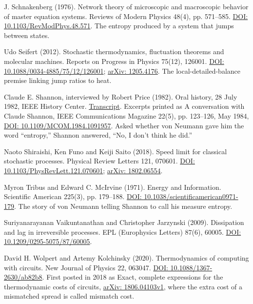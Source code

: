 \noindent J. Schnakenberg (1976). Network theory of microscopic and macroscopic behavior of master equation systems. Reviews of Modern Physics 48(4), pp. 571--585. \href{https://doi.org/10.1103/RevModPhys.48.571}{DOI: 10.1103/RevModPhys.48.571}. The entropy produced by a system that jumps between states.
\par\medskip

\noindent Udo Seifert (2012). Stochastic thermodynamics, fluctuation theorems and molecular machines. Reports on Progress in Physics 75(12), 126001. \href{https://doi.org/10.1088/0034-4885/75/12/126001}{DOI: 10.1088/0034-4885/75/12/126001}; \href{https://arxiv.org/abs/1205.4176}{arXiv: 1205.4176}. The local-detailed-balance premise linking jump ratios to heat.
\par\medskip

\noindent Claude E. Shannon, interviewed by Robert Price (1982). Oral history, 28 July 1982, IEEE History Center. \href{https://ethw.org/Oral-History:Claude_E._Shannon}{Transcript}. Excerpts printed as A conversation with Claude Shannon, IEEE Communications Magazine 22(5), pp. 123--126, May 1984, \href{https://doi.org/10.1109/MCOM.1984.1091957}{DOI: 10.1109/MCOM.1984.1091957}. Asked whether von Neumann gave him the word ``entropy,'' Shannon answered, ``No, I don't think he did.''
\par\medskip

\noindent Naoto Shiraishi, Ken Funo and Keiji Saito (2018). Speed limit for classical stochastic processes. Physical Review Letters 121, 070601. \href{https://doi.org/10.1103/PhysRevLett.121.070601}{DOI: 10.1103/PhysRevLett.121.070601}; \href{https://arxiv.org/abs/1802.06554}{arXiv: 1802.06554}.
\par\medskip

\noindent Myron Tribus and Edward C. McIrvine (1971). Energy and Information. Scientific American 225(3), pp. 179--188. \href{https://doi.org/10.1038/scientificamerican0971-179}{DOI: 10.1038/scientificamerican0971-179}. The story of von Neumann telling Shannon to call his measure entropy.
\par\medskip

\noindent Suriyanarayanan Vaikuntanathan and Christopher Jarzynski (2009). Dissipation and lag in irreversible processes. EPL (Europhysics Letters) 87(6), 60005. \href{https://doi.org/10.1209/0295-5075/87/60005}{DOI: 10.1209/0295-5075/87/60005}.
\par\medskip

\noindent David H. Wolpert and Artemy Kolchinsky (2020). Thermodynamics of computing with circuits. New Journal of Physics 22, 063047. \href{https://doi.org/10.1088/1367-2630/ab82b8}{DOI: 10.1088/1367-2630/ab82b8}. First posted in 2018 as Exact, complete expressions for the thermodynamic costs of circuits, \href{https://arxiv.org/abs/1806.04103v1}{arXiv: 1806.04103v1}, where the extra cost of a mismatched spread is called mismatch cost.
\par\medskip

